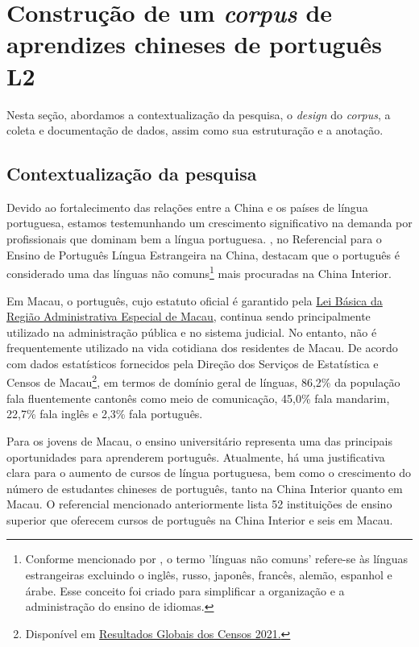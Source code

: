 \documentclass[portuguese]{textolivre}
\begin{document}
\section{Construção de um \textit{corpus} de aprendizes chineses de português L2}\label{sec aprensetação}

Nesta seção, abordamos a contextualização da pesquisa, o \textit{design} do \textit{corpus}, a coleta e documentação de dados, assim como sua estruturação e a anotação. 

\subsection{Contextualização da pesquisa}
Devido ao fortalecimento das relações entre a China e os países de língua portuguesa, estamos testemunhando um crescimento significativo na demanda por profissionais que dominam bem a língua portuguesa. \textcite{Grosso2021}, no Referencial para o Ensino de Português Língua Estrangeira na China, destacam que o português é considerado uma das línguas não comuns\footnote{Conforme mencionado por \textcite{Yan2019}, o termo 'línguas não comuns' refere-se às línguas estrangeiras excluindo o inglês, russo, japonês, francês, alemão, espanhol e árabe. Esse conceito foi criado para simplificar a organização e a administração do ensino de idiomas.} mais procuradas na China Interior. 

Em Macau, o português, cujo estatuto oficial é garantido pela \href{https://bo.io.gov.mo/bo/i/1999/leibasica/index.a}{Lei Básica da Região Administrativa Especial de Macau}, continua sendo principalmente utilizado na administração pública e no sistema judicial. No entanto, não é frequentemente utilizado na vida cotidiana dos residentes de Macau. De acordo com dados estatísticos fornecidos pela Direção dos Serviços de Estatística e Censos de Macau\footnote{Disponível em \href{https://www.dsec.gov.mo/getAttachment/fda23546-c321-47ae-a5b3-b4a5071cf732/P_CEN_PUB_2021_Y.aspx}{Resultados Globais dos Censos 2021.}}, em termos de domínio geral de línguas, 86,2\% da população fala fluentemente cantonês como meio de comunicação, 45,0\% fala mandarim, 22,7\% fala inglês e 2,3\% fala português. 


Para os jovens de Macau, o ensino universitário representa uma das principais oportunidades para aprenderem português. Atualmente, há uma justificativa clara para o aumento de cursos de língua portuguesa, bem como o crescimento do número de estudantes chineses de português, tanto na China Interior quanto em Macau. O referencial mencionado anteriormente lista 52 instituições de ensino superior que oferecem cursos de português na China Interior e seis em Macau.
\end{document}

